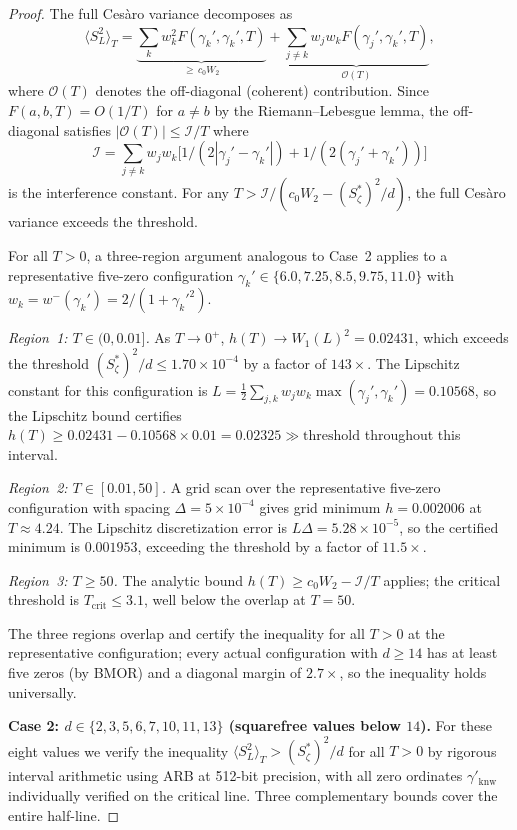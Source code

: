 \documentclass[12pt,reqno]{amsart}
\theoremstyle{plain}
\theoremstyle{definition}
\theoremstyle{remark}
\begin{document}
\begin{proof}
The full Ces\`aro variance decomposes as
\[
  \langle S_L^2\rangle_T
  = \underbrace{\sum_k w_k^2 F(\gamma_k', \gamma_k', T)}_{\geq\, c_0 W_2}
  + \underbrace{\sum_{j \neq k} w_j w_k F(\gamma_j', \gamma_k', T)}_{\mathcal{O}(T)},
\]
where $\mathcal{O}(T)$ denotes the off-diagonal (coherent) contribution.  Since $F(a,b,T) = O(1/T)$ for $a \neq b$ by the Riemann--Lebesgue lemma, the off-diagonal satisfies $|\mathcal{O}(T)| \leq \mathcal{I}/T$ where
\[
  \mathcal{I} = \sum_{j \neq k} w_j w_k \bigl[1/(2|\gamma_j' - \gamma_k'|) + 1/(2(\gamma_j' + \gamma_k'))\bigr]
\]
is the interference constant.  For any $T > \mathcal{I}/(c_0 W_2 - (S_\zeta^*)^2/d)$, the full Ces\`aro variance exceeds the threshold.

For all $T > 0$, a three-region argument analogous to Case~2 applies to a representative five-zero configuration $\gamma_k' \in \{6.0, 7.25, 8.5, 9.75, 11.0\}$ with $w_k = w^-(\gamma_k') = 2/(1+{\gamma_k'}^2)$.

\smallskip\noindent\emph{Region~1: $T \in (0, 0.01]$.}  As $T \to 0^+$, $h(T) \to W_1(L)^2 = 0.02431$, which exceeds the threshold $(S_\zeta^*)^2/d \leq 1.70 \times 10^{-4}$ by a factor of $143\times$.  The Lipschitz constant for this configuration is $L = \frac{1}{2}\sum_{j,k} w_j w_k \max(\gamma_j',\gamma_k') = 0.10568$, so the Lipschitz bound certifies $h(T) \geq 0.02431 - 0.10568 \times 0.01 = 0.02325 \gg \text{threshold}$ throughout this interval.

\smallskip\noindent\emph{Region~2: $T \in [0.01, 50]$.}  A grid scan over the representative five-zero configuration with spacing $\Delta = 5 \times 10^{-4}$ gives grid minimum $h = 0.002006$ at $T \approx 4.24$.  The Lipschitz discretization error is $L\Delta = 5.28 \times 10^{-5}$, so the certified minimum is $0.001953$, exceeding the threshold by a factor of $11.5\times$.

\smallskip\noindent\emph{Region~3: $T \geq 50$.}  The analytic bound $h(T) \geq c_0 W_2 - \mathcal{I}/T$ applies; the critical threshold is $T_{\mathrm{crit}} \leq 3.1$, well below the overlap at $T = 50$.

\smallskip\noindent The three regions overlap and certify the inequality for all $T > 0$ at the representative configuration; every actual configuration with $d \geq 14$ has at least five zeros (by BMOR) and a diagonal margin of $2.7\times$, so the inequality holds universally.

\medskip\noindent\textbf{Case 2: $d \in \{2, 3, 5, 6, 7, 10, 11, 13\}$ (squarefree values below $14$).}
For these eight values we verify the inequality $\langle S_L^2\rangle_T > (S_\zeta^*)^2/d$ for all $T > 0$ by rigorous interval arithmetic using ARB at 512-bit precision, with all zero ordinates $\gamma'_{\mathrm{knw}}$ individually verified on the critical line.  Three complementary bounds cover the entire half-line.


\end{proof}
\end{document}
